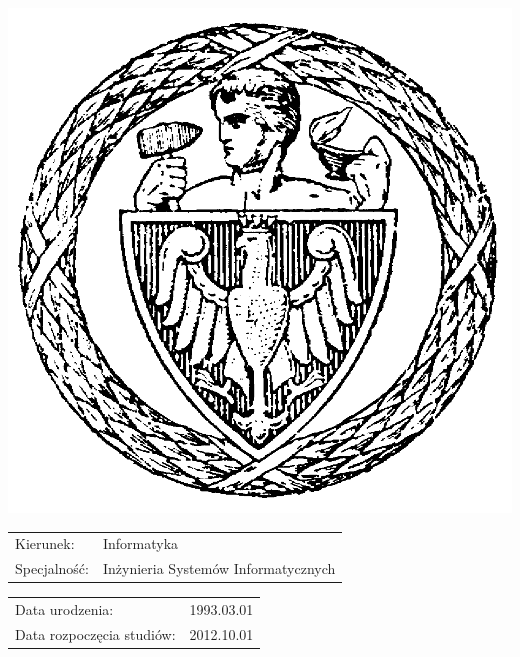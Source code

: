 \begin{minipage}{0.2\textwidth}
    \begin{center}
        \includegraphics[width=\textwidth]{tytulowa_res/logo_pw.png}
    \end{center}
\end{minipage}

\begin{minipage}{0.75\textwidth}
    \begin{flushleft} \normalsize
        \def\arraystretch{2}
        \begin{tabular}{ p{3cm} p{7cm} }
            Kierunek: & Informatyka \\
            Specjalność: & Inżynieria Systemów Informatycznych\\

        \end{tabular}
        \begin{tabular}{p{8cm} r}
            Data urodzenia: & 1993.03.01 \\
            Data rozpoczęcia studiów: & 2012.10.01
        \end{tabular}
    \end{flushleft}
\end{minipage}

~\\[0.2cm]


